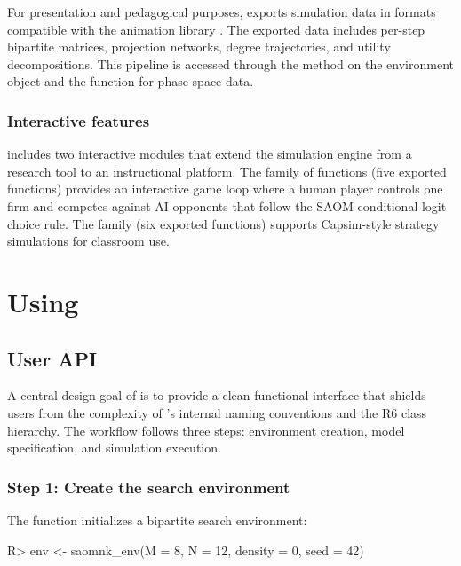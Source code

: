 \documentclass[
  article]{jss}
\begin{document}
For presentation and pedagogical purposes,  exports
simulation data in formats compatible with the  animation
library \citep{Manim2022}. The exported data includes per-step bipartite
matrices, projection networks, degree trajectories, and utility
decompositions. This pipeline is accessed through the
 method on the environment object and the
 function for phase space data.

\subsubsection{Interactive features}\label{sec:interactive}

 includes two interactive modules that extend the
simulation engine from a research tool to an instructional platform. The
 family of functions (five exported functions)
provides an interactive game loop where a human player controls one firm
and competes against AI opponents that follow the SAOM conditional-logit
choice rule. The  family (six exported
functions) supports Capsim-style strategy simulations for classroom use.

\section[Using searchnet]{Using }\label{sec:using}

\subsection{User API}\label{sec:api}

A central design goal of  is to provide a clean
functional interface that shields users from the complexity of
's internal naming conventions and the R6 class hierarchy.
The workflow follows three steps: environment creation, model
specification, and simulation execution.

\subsubsection{Step 1: Create the search
environment}\label{step-1-create-the-search-environment}

The  function initializes a bipartite search
environment:

\begin{CodeChunk}
\begin{CodeInput}
R> env <- saomnk_env(M = 8, N = 12, density = 0, seed = 42)
\end{CodeInput}
\end{CodeChunk}
\end{document}
